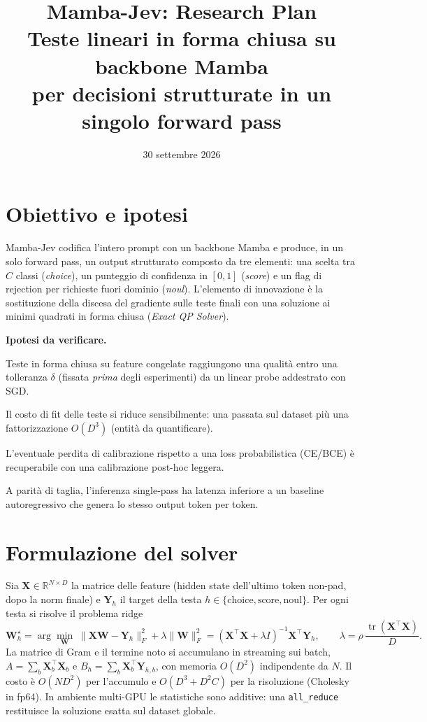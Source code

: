 \documentclass[11pt,a4paper]{article}
\title{\textbf{Mamba-Jev: Research Plan}\\[4pt]
\large Teste lineari in forma chiusa su backbone Mamba\\per decisioni strutturate in un singolo forward pass}
\author{}
\date{30 settembre 2026}
\newcommand{\X}{\bm{X}}
\newcommand{\W}{\bm{W}}
\newcommand{\Y}{\bm{Y}}
\newcommand{\tr}{\operatorname{tr}}
\begin{document}
\maketitle
\thispagestyle{fancy}

\section{Obiettivo e ipotesi}

Mamba-Jev codifica l'intero prompt con un backbone Mamba e produce, in un solo forward pass, un output strutturato composto da tre elementi: una scelta tra $C$ classi (\emph{choice}), un punteggio di confidenza in $[0,1]$ (\emph{score}) e un flag di rejection per richieste fuori dominio (\emph{noul}). L'elemento di innovazione è la sostituzione della discesa del gradiente sulle teste finali con una soluzione ai minimi quadrati in forma chiusa (\emph{Exact QP Solver}).

\textbf{Ipotesi da verificare.}
\begin{description}[leftmargin=1.6cm,labelwidth=1.2cm,font=\bfseries]
  \item[H1] Teste in forma chiusa su feature congelate raggiungono una qualità entro una tolleranza $\delta$ (fissata \emph{prima} degli esperimenti) da un linear probe addestrato con SGD.
  \item[H2] Il costo di fit delle teste si riduce sensibilmente: una passata sul dataset più una fattorizzazione $O(D^3)$ (entità da quantificare).
  \item[H3] L'eventuale perdita di calibrazione rispetto a una loss probabilistica (CE/BCE) è recuperabile con una calibrazione post-hoc leggera.
  \item[H4] A parità di taglia, l'inferenza single-pass ha latenza inferiore a un baseline autoregressivo che genera lo stesso output token per token.
\end{description}

\section{Formulazione del solver}

Sia $\X\in\mathbb{R}^{N\times D}$ la matrice delle feature (hidden state dell'ultimo token non-pad, dopo la norm finale) e $\Y_h$ il target della testa $h\in\{\text{choice},\text{score},\text{noul}\}$. Per ogni testa si risolve il problema ridge
\begin{equation}
  \W_h^\star=\arg\min_{\W}\;\|\X\W-\Y_h\|_F^2+\lambda\|\W\|_F^2
  =(\X^\top\X+\lambda I)^{-1}\X^\top\Y_h,
  \qquad \lambda=\rho\,\frac{\tr(\X^\top\X)}{D}.
\end{equation}
La matrice di Gram e il termine noto si accumulano in streaming sui batch, $A=\sum_b\X_b^\top\X_b$ e $B_h=\sum_b\X_b^\top\Y_{h,b}$, con memoria $O(D^2)$ indipendente da $N$. Il costo è $O(ND^2)$ per l'accumulo e $O(D^3+D^2C)$ per la risoluzione (Cholesky in fp64). In ambiente multi-GPU le statistiche sono additive: una \texttt{all\_reduce} restituisce la soluzione esatta sul dataset globale.
\end{document}
